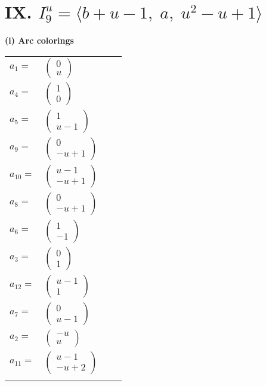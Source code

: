 \documentclass[1p]{elsarticle_modified}
\theoremstyle{definition}
\begin{document}
\centering \section*{IX. $I^u_{9}= \langle b+u-1,\;a,\;u^2- u+1 \rangle$}
\flushleft \textbf{(i) Arc colorings}\\
\begin{tabular}{m{7pt} m{180pt} m{7pt} m{180pt} }
\flushright $a_{1}=$&$\begin{pmatrix}0\\u\end{pmatrix}$ \\
\flushright $a_{4}=$&$\begin{pmatrix}1\\0\end{pmatrix}$ \\
\flushright $a_{5}=$&$\begin{pmatrix}1\\u-1\end{pmatrix}$ \\
\flushright $a_{9}=$&$\begin{pmatrix}0\\- u+1\end{pmatrix}$ \\
\flushright $a_{10}=$&$\begin{pmatrix}u-1\\- u+1\end{pmatrix}$ \\
\flushright $a_{8}=$&$\begin{pmatrix}0\\- u+1\end{pmatrix}$ \\
\flushright $a_{6}=$&$\begin{pmatrix}1\\-1\end{pmatrix}$ \\
\flushright $a_{3}=$&$\begin{pmatrix}0\\1\end{pmatrix}$ \\
\flushright $a_{12}=$&$\begin{pmatrix}u-1\\1\end{pmatrix}$ \\
\flushright $a_{7}=$&$\begin{pmatrix}0\\u-1\end{pmatrix}$ \\
\flushright $a_{2}=$&$\begin{pmatrix}- u\\u\end{pmatrix}$ \\
\flushright $a_{11}=$&$\begin{pmatrix}u-1\\- u+2\end{pmatrix}$\\&\end{tabular}
\end{document}
